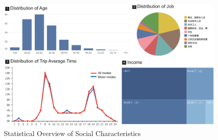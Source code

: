 \begin{figure}[htb!]
 \centering %
 \includegraphics[width=\columnwidth]{pictures/data_detail}
 \caption{Statistical Overview of Social Characteristics}
 \label{fig:data_stat}
\end{figure}


